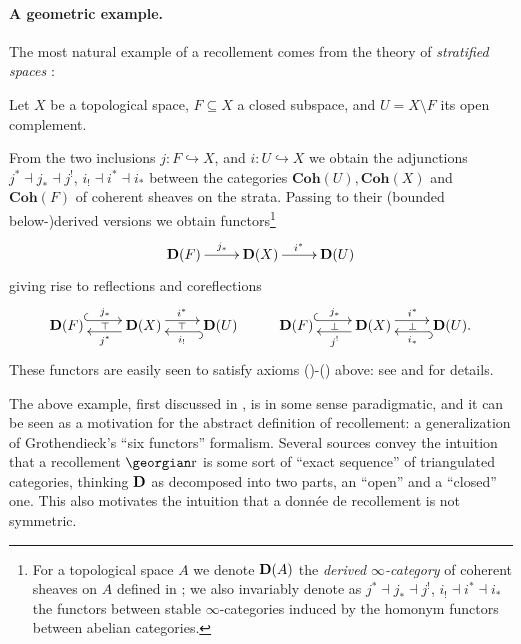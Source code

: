 \paragraph{A geometric example.} The most natural example of a recollement comes from the theory of \emph{stratified spaces} \cite{Wein,Banagl}:
\begin{example}\label{geomrecoll}
Let $X$ be a topological space, $F \subseteq X$ a closed subspace, and $U=X\setminus F$ its open complement. 

From the two inclusions $j\colon F \hookrightarrow X$, and $i\colon U\hookrightarrow X$ we obtain the adjunctions $j^*\dashv j_*\dashv j^!$, $i_!\dashv i^*\dashv i_*$ between the categories $\mathbf{Coh}(U), \mathbf{Coh}(X)$ and $\mathbf{Coh}(F)$ of coherent sheaves on the strata. Passing to their (bounded below-)derived versions we obtain functors\footnote{For a topological space $A$ we denote $\textbf{D}(A)$ the \emph{derived $\infty$\hyp{}category} of coherent sheaves on $A$ defined in \cite[\S\textbf{1.3.2}]{LurieHA}; we also invariably denote as $j^*\dashv j_*\dashv j^!$, $i_!\dashv i^*\dashv i_*$ the functors between stable $\infty$\hyp{}categories induced by the homonym functors between abelian categories.}
\[
\xymatrix{
  \D(F)	& \D(X)	& \D(U)
  \ar "1,1";"1,2" ^{j_*}
  \ar "1,2";"1,3" ^{i^*}
}
\]
giving rise to reflections and coreflections
\[
\xymatrix{
  \D(F)	& \D(X)	& \D(U)	& \D(F)	& \D(X)	& \D(U).
  \ar@{}|\top "1,1";"1,2" 
  \ar@<4pt>@{^{(}->} "1,1";"1,2" ^{j_*}
  \ar@<4pt> "1,2";"1,1" ^{j^*}
  \ar@{}|\top "1,2";"1,3" 
  \ar@<4pt> "1,2";"1,3" ^{i^*}
  \ar@<4pt>@{^{(}->} "1,3";"1,2" ^{i_!}
  \ar@{}|\perp "1,4";"1,5" 
  \ar@<4pt>@{^{(}->} "1,4";"1,5" ^{j_*}
  \ar@<4pt> "1,5";"1,4" ^{j^!}
  \ar@<4pt> "1,5";"1,6" ^{i^*}
  \ar@{}|\perp "1,5";"1,6" 
  \ar@<4pt>@{^{(}->} "1,6";"1,5" ^{i_*}
}
\]
These functors are easily seen to satisfy axioms ()-() above: see \cite[\textbf{1.4.3.1-5}]{BBDPervers} and \cite[\textbf{7.2.1}]{Banagl} for details.
\end{example}
\begin{remark}
The above example, first discussed in \cite{BBDPervers}, is in some sense paradigmatic, and it can be seen as a motivation for the abstract definition of recollement: a generalization of Grothendieck's ``six functors'' formalism. Several sources \cite{han2014recollements,bazzoni2013recollements,hugel2011recollements,chen2014recollements} convey the intuition that a recollement $\rec$ is some sort of ``exact sequence'' of triangulated categories, thinking $\textbf{D}$ as decomposed into two parts, an ``open'' and a ``closed'' one. This also motivates the intuition that a donn\'ee de recollement is not symmetric.
\end{remark}
